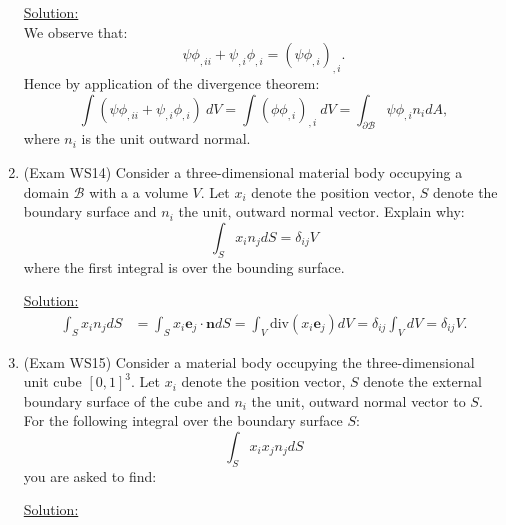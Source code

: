 \documentclass{article}
\newcommand{\ee}{\end{equation}}
\newcommand{\be}{\begin{equation}}
\newcommand{\pa}{\partial}
\newcommand{\bs}{\boldsymbol}
\begin{document}
\begin{enumerate}
\underline{Solution:} \\
We observe that:
\be
\psi \phi_{,ii}+\psi_{,i}\phi_{,i}=(\psi \phi_{,i})_{,i}.
\ee
Hence by application of the divergence theorem:
\be
\int( \psi \phi_{,ii}+\psi_{,i}\phi_{,i})~dV=\int(\phi \phi_{,i})_{,i} ~dV= \int_{\pa \mathcal{B}} \psi \phi_{,i} n_i dA,
\ee
where $n_i$ is the unit outward normal.

\item (Exam WS14) Consider a three-dimensional material body occupying a domain $\mathcal{B}$ with a  a volume $V$. Let  $x_i$ denote the position vector,  $S$ denote the boundary surface and $n_i$ the unit,  outward
normal vector. Explain why:
\be
\int_S x_i n_j dS=\delta_{ij} V
\ee
where the first integral is over the bounding surface.

\underline{Solution:}
\begin{align}
\int_S x_i n_j dS &= \int_S x_i \bs e_j \cdot \bs n dS = \int_V \textrm{div}(x_i \bs e_j) dV = \delta_{ij} \int_V dV = \delta_{ij} V.
\end{align}

\item (Exam WS15) Consider a material body occupying the three-dimensional unit cube $[0, 1]^3$.
Let $x_i$ denote the position vector, $S$ denote the external boundary surface of the cube and $n_i$
the unit, outward normal vector to $S$. For the following integral over the boundary surface
$S$:
\be
\int_S x_i x_j n_j dS
\ee
you are asked to find:

\underline{Solution:}



\end{enumerate}
\end{document}
